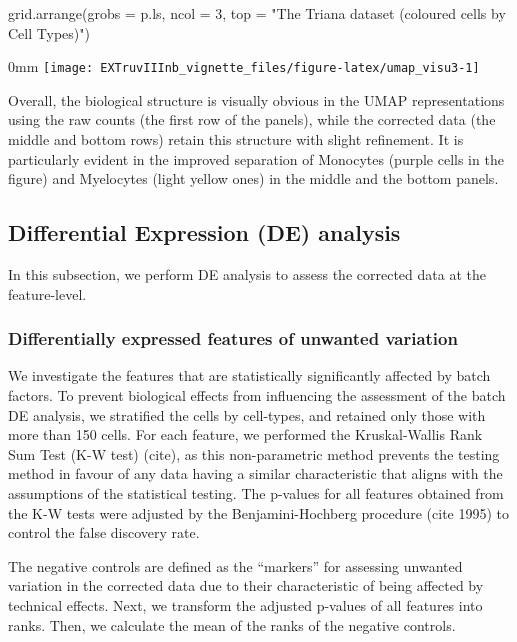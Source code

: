 \documentclass[]{article}
\newcommand{\hlnum}[1]{\textcolor[rgb]{0.816,0.125,0.439}{#1}}%
\newcommand{\hlstr}[1]{\textcolor[rgb]{0.251,0.627,0.251}{#1}}%
\newcommand{\hlstd}[1]{\textcolor[rgb]{0.251,0.251,0.251}{#1}}%
\newenvironment{Shaded}{\begin{myshaded}}{\end{myshaded}}
\newcommand{\DecValTok}[1]{\hlnum{#1}}
\newcommand{\StringTok}[1]{\hlstr{#1}}
\newcommand{\FunctionTok}[1]{\hlstd{#1}}
\newcommand{\AttributeTok}[1]{{#1}}
\newcommand{\NormalTok}[1]{\hlstd{#1}}
\begin{document}
\begin{Shaded}
\begin{Highlighting}[]
\FunctionTok{grid.arrange}\NormalTok{(}\AttributeTok{grobs =}\NormalTok{ p.ls, }\AttributeTok{ncol =} \DecValTok{3}\NormalTok{, }\AttributeTok{top =} \StringTok{"The Triana dataset (coloured cells by Cell Types)"}\NormalTok{)}
\end{Highlighting}
\end{Shaded}

\begin{adjustwidth}{\fltoffset}{0mm}
\texttt{[image: EXTruvIIInb\_vignette\_files/figure-latex/umap\_visu3-1]} \end{adjustwidth}

Overall, the biological structure is visually obvious in the UMAP representations using the raw counts (the first row of the panels), while the corrected data (the middle and bottom rows) retain this structure with slight refinement. It is particularly evident in the improved separation of Monocytes (purple cells in the figure) and Myelocytes (light yellow ones) in the middle and the bottom panels.

\subsection{Differential Expression (DE) analysis}\label{differential-expression-de-analysis}

In this subsection, we perform DE analysis to assess the corrected data at the feature-level.

\subsubsection{Differentially expressed features of unwanted variation}\label{differentially-expressed-features-of-unwanted-variation}

We investigate the features that are statistically significantly affected by batch factors. To prevent biological effects from influencing the assessment of the batch DE analysis, we stratified the cells by cell-types, and retained only those with more than 150 cells.
For each feature, we performed the Kruskal-Wallis Rank Sum Test (K-W test) (cite), as this non-parametric method prevents the testing method in favour of any data having a similar characteristic that aligns with the assumptions of the statistical testing. The p-values for all features obtained from the K-W tests were adjusted by the Benjamini-Hochberg procedure (cite 1995) to control the false discovery rate.

The negative controls are defined as the ``markers'' for assessing unwanted variation in the corrected data due to their characteristic of being affected by technical effects. Next, we transform the adjusted p-values of all features into ranks. Then, we calculate the mean of the ranks of the negative controls.
\end{document}
